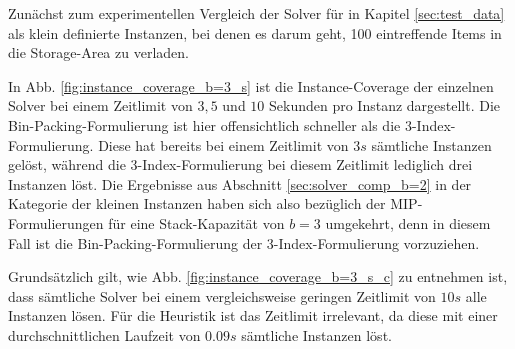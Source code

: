 Zunächst zum experimentellen Vergleich der Solver für in Kapitel \ref{sec:test_data} als klein definierte
Instanzen, bei denen es darum geht, 100 eintreffende Items in die Storage-Area zu verladen.

In Abb. \ref{fig:instance_coverage_b=3_s} ist die Instance-Coverage der einzelnen Solver bei einem Zeitlimit von $3, 5$
und $10$ Sekunden pro Instanz dargestellt. Die Bin-Packing-Formulierung ist hier offensichtlich schneller als die 3-Index-Formulierung.
Diese hat bereits bei einem Zeitlimit von $3s$ sämtliche Instanzen gelöst, während die 3-Index-Formulierung
bei diesem Zeitlimit lediglich drei Instanzen löst. Die Ergebnisse aus Abschnitt \ref{sec:solver_comp_b=2} in der Kategorie der kleinen
Instanzen haben sich also bezüglich der MIP-Formulierungen für eine Stack-Kapazität von $b = 3$ umgekehrt, denn in diesem Fall
ist die Bin-Packing-Formulierung der 3-Index-Formulierung vorzuziehen.

Grundsätzlich gilt, wie Abb. \ref{fig:instance_coverage_b=3_s_c} zu entnehmen ist, dass sämtliche Solver
bei einem vergleichsweise geringen Zeitlimit von $10s$ alle Instanzen lösen. Für die Heuristik ist das Zeitlimit irrelevant,
da diese mit einer durchschnittlichen Laufzeit von $0.09s$ sämtliche Instanzen löst.

